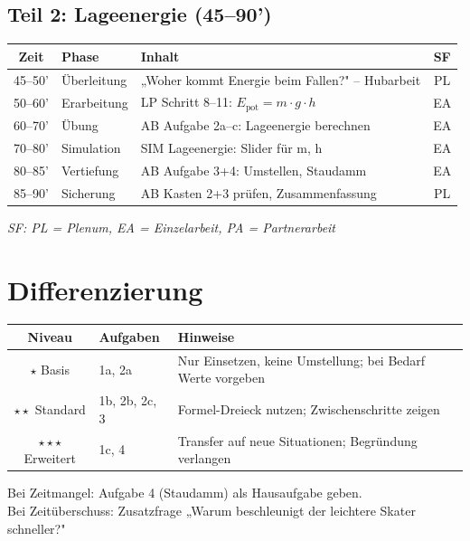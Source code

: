 \documentclass[11pt, a4paper]{article}
\begin{document}
\subsection*{Teil 2: Lageenergie (45–90')}

\begin{tabularx}{\textwidth}{@{}c|l|X|c@{}}
\toprule
\textbf{Zeit} & \textbf{Phase} & \textbf{Inhalt} & \textbf{SF} \\
\midrule
45–50' & Überleitung & „Woher kommt Energie beim Fallen?" – Hubarbeit & PL \\
50–60' & Erarbeitung & LP Schritt 8–11: $E_\text{pot} = m \cdot g \cdot h$ & EA \\
60–70' & Übung & AB Aufgabe 2a–c: Lageenergie berechnen & EA \\
70–80' & Simulation & SIM Lageenergie: Slider für m, h & EA \\
80–85' & Vertiefung & AB Aufgabe 3+4: Umstellen, Staudamm & EA \\
85–90' & Sicherung & AB Kasten 2+3 prüfen, Zusammenfassung & PL \\
\bottomrule
\end{tabularx}

\vspace{0.5em}
\textit{SF: PL = Plenum, EA = Einzelarbeit, PA = Partnerarbeit}


\section*{Differenzierung}

\begin{tabularx}{\textwidth}{@{}c|l|X@{}}
\toprule
\textbf{Niveau} & \textbf{Aufgaben} & \textbf{Hinweise} \\
\midrule
$\star$ Basis & 1a, 2a & Nur Einsetzen, keine Umstellung; bei Bedarf Werte vorgeben \\
$\star\star$ Standard & 1b, 2b, 2c, 3 & Formel-Dreieck nutzen; Zwischenschritte zeigen \\
$\star\star\star$ Erweitert & 1c, 4 & Transfer auf neue Situationen; Begründung verlangen \\
\bottomrule
\end{tabularx}

\begin{warnbox}[Zeitpuffer]
Bei Zeitmangel: Aufgabe 4 (Staudamm) als Hausaufgabe geben.\\
Bei Zeitüberschuss: Zusatzfrage „Warum beschleunigt der leichtere Skater schneller?"
\end{warnbox}
\end{document}
